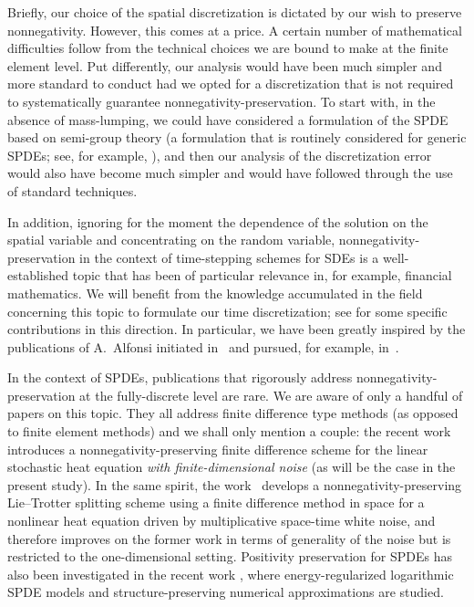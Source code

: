 \documentclass[12pt]{article}
\begin{document}
Briefly, our choice of the spatial discretization is dictated by our wish to preserve nonnegativity. However, this comes at a price. A certain number of mathematical difficulties follow from the technical choices we are bound to make at the finite element level. Put differently, our analysis would have been much simpler and more standard to conduct had we opted for a discretization that is not required to systematically guarantee nonnegativity-preservation. To start with, in the absence of mass-lumping, we could have considered a formulation of the SPDE based on semi-group theory (a formulation that is routinely considered for generic SPDEs; see, for example, \cite{gyongy2009rate,gyongy2005discretization,tambue2019strong,kruse2014optimal,hausenblas2002numerical,yan2003finite}), and then our analysis of the discretization error would also have become much simpler and would have followed through the use of  standard techniques.
 
In addition, ignoring for the moment the dependence of the solution on the spatial variable and concentrating on the random variable, nonnegativity-preservation in the context of time-stepping schemes for SDEs is a well-established topic that has been of particular relevance in, for example, financial mathematics.
We will benefit from the knowledge accumulated in the field concerning this topic to formulate our time discretization; see \cite{scalone2022positivity,szpruch2011numerical,mao2021positivity,lei2023strong} for some specific contributions in this direction. In particular, we have been greatly inspired by the publications of A.~Alfonsi initiated in~\cite{alfonsi2005} and pursued, for example, in~\cite{alfonsi2010,alfonsi-book}.
 
In the context of SPDEs, publications that rigorously address nonnegativity-preservation at the fully-discrete level are rare. We are aware of only a handful of papers on this topic. They all address finite difference type methods (as opposed to finite element methods) and we shall only mention a couple: the recent work \cite{yang2022stochastic} introduces a nonnegativity-preserving finite difference scheme for the linear stochastic heat equation \emph{with finite-dimensional noise} (as will be the case in the present study). In the same spirit, the work~\cite{brehier2023analysis} develops a nonnegativity-preserving Lie–Trotter splitting scheme using a finite difference method in space for a nonlinear heat equation driven by multiplicative space-time white noise, and therefore improves on the former work in terms of generality of the noise but is restricted to the one-dimensional setting.  Positivity preservation for SPDEs has also been investigated in the recent work \cite{cui2023energy}, where energy-regularized logarithmic SPDE models and structure-preserving numerical approximations are studied.
\end{document}
